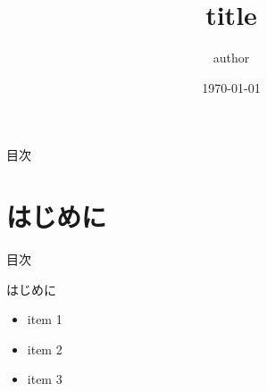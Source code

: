 \documentclass[aspectratio=169, dvipdfmx, 11pt, xcolor={usenames, dvipsnames}]{beamer} %
\title{title}
\date{\today}
\author{author}
\begin{document}
\maketitle

\begin{frame}{目次}
	\tableofcontents
\end{frame}

\section{はじめに}
\begin{frame}{目次}
	\tableofcontents[currentsection]
\end{frame}

\begin{frame}{はじめに}
	\begin{itemize}
		\item item 1
		\item item 2
		\item item 3
	\end{itemize}
\end{frame}
\end{document}

